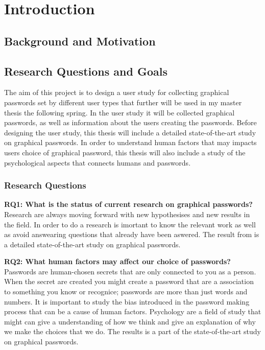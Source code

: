 \chapter{Introduction}

  \section{Background and Motivation}
      

  \clearpage
  \section{Research Questions and Goals}
  The aim of this project is to design a user study for collecting graphical passwords set by different user types that further will be used in my master thesis the following spring. In the user study it will be collected graphical passwords, as well as information about the users creating the passwords. Before designing the user study, this thesis will include a detailed state-of-the-art study on graphical passwords. In order to understand human factors that may impacts users choice of graphical password, this thesis will also include a study of the psychological aspects that connects humans and passwords.

    \subsection*{Research Questions}
    {\bf RQ1: What is the status of current research on graphical passwords? } \\
    Research are always moving forward with new hypothesises and new results in the field. In order to do a research is imortant to know the relevant work as well as avoid answearing questions that already have been aswered. The result from is a detailed state-of-the-art study on graphical passwords.
    
    {\bf RQ2: What human factors may affect our choice of passwords?} \\
    Passwords are human-chosen secrets that are only connected to you as a person. When the secret are created you might create a password that are a association to something you know or recognice; passwords are more than just words and numbers. It is important to study the bias introduced in the password making process that can be a cause of human factors. Psychology are a field of study that might can give a understanding of how we think and give an explanation of why we make the choices that we do. The results is a part of the state-of-the-art study on graphical passwords. 
    

